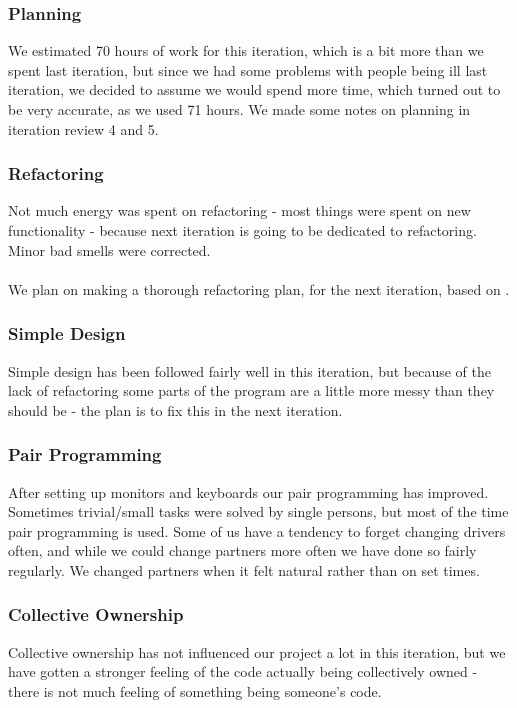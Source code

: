 \subsubsection{Planning}
We estimated 70 hours of work for this iteration, which is a bit more than we spent last iteration, but since we had some problems with people being ill last iteration, we decided to assume we would spend more time, which turned out to be very accurate, as we used 71 hours. We made some notes on planning in iteration review 4 and 5.

\subsubsection{Refactoring}
Not much energy was spent on refactoring - most things were spent on new functionality - because next iteration is going to be dedicated to refactoring.
Minor bad smells were corrected.\\\\
We plan on making a thorough refactoring plan, for the next iteration, based on \citep{fowler:refac}.

\subsubsection{Simple Design}
Simple design has been followed fairly well in this iteration, but because of the lack of refactoring some parts of the program are a little more messy than they should be - the plan is to fix this in the next iteration.

\subsubsection{Pair Programming}
After setting up monitors and keyboards our pair programming has improved. Sometimes trivial/small tasks were solved by single persons, but most of the time pair programming is used.
Some of us have a tendency to forget changing drivers often, and while we could change partners more often we have done so fairly regularly. We changed partners when it felt natural rather than on set times.

\subsubsection{Collective Ownership}
Collective ownership has not influenced our project a lot in this iteration, but we have gotten a stronger feeling of the code actually being collectively owned - there is not much feeling of something being someone’s code.

